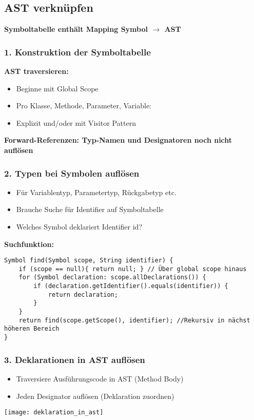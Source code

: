 \subsection{AST verknüpfen}
\textbf{Symboltabelle enthält Mapping Symbol $\rightarrow$ AST}\\
\begin{minipage}{0,5\linewidth}
    \subsubsection{1. Konstruktion der Symboltabelle}
    \textbf{AST traversieren:}
    \begin{itemize}[topsep=0pt]
        \itemsep -0.2em
        \item Beginne mit Global Scope
        \item Pro Klasse, Methode, Parameter, Variable:
        \item Explizit und/oder mit Visitor Pattern
    \end{itemize}
    \textbf{Forward-Referenzen: Typ-Namen und Designatoren noch nicht auflösen}
\end{minipage}
\begin{minipage}{0,5\linewidth}
    \subsubsection{2. Typen bei Symbolen auflösen}
    \begin{itemize}[topsep=0pt]
        \itemsep -0.2em
        \item Für Variablentyp, Parametertyp, Rückgabetyp etc.
        \item Brauche Suche für Identifier auf Symboltabelle
        \item Welches Symbol deklariert Identifier \dq id\dq?
    \end{itemize}
\end{minipage}
\textbf{Suchfunktion:}
\begin{lstlisting}
Symbol find(Symbol scope, String identifier) {
    if (scope == null){ return null; } // Über global scope hinaus
    for (Symbol declaration: scope.allDeclarations()) {
        if (declaration.getIdentifier().equals(identifier)) {
            return declaration;
        }
    }
    return find(scope.getScope(), identifier); //Rekursiv in nächst höheren Bereich
}
\end{lstlisting}
\begin{minipage}{0,5\linewidth}
    \subsubsection{3. Deklarationen in AST auflösen}
    \begin{itemize}[topsep=0pt]
        \itemsep -0.2em
        \item Traversiere Ausführungscode in AST (Method Body)
        \item Jeden Designator auflösen (Deklaration zuordnen)
    \end{itemize}
    \texttt{[image: deklaration\_in\_ast]}
\end{minipage}
